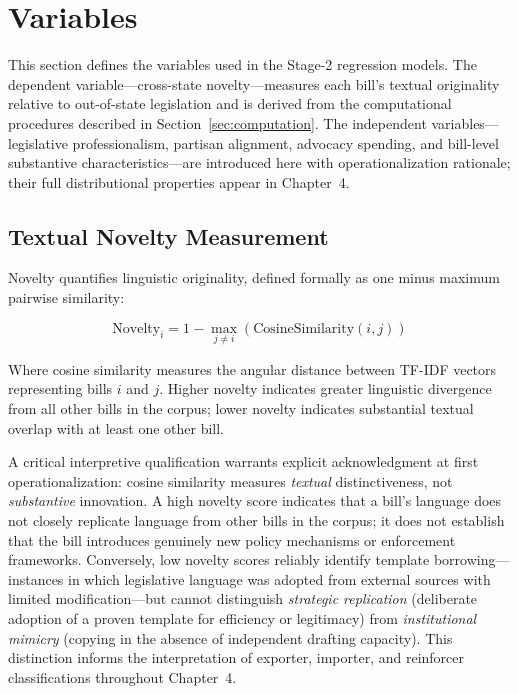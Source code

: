 \section{Variables}
\label{sec:variables}

This section defines the variables used in the Stage-2 regression models. The dependent variable---cross-state novelty---measures each bill's textual originality relative to out-of-state legislation and is derived from the computational procedures described in Section~\ref{sec:computation}. The independent variables---legislative professionalism, partisan alignment, advocacy spending, and bill-level substantive characteristics---are introduced here with operationalization rationale; their full distributional properties appear in Chapter~4.

\subsection{Textual Novelty Measurement}
\label{sec:novelty}
Novelty quantifies linguistic originality, defined formally as one minus maximum pairwise similarity\parencite{wilkersonTracingFlowPolicy2015, linderTextPolicyMeasuring2020}:

\begin{equation}
\text{Novelty}_i = 1 - \max_{j \neq i} \left( \text{CosineSimilarity}(i, j) \right)
\end{equation}

Where cosine similarity measures the angular distance between TF-IDF vectors representing bills $i$ and $j$. Higher novelty indicates greater linguistic divergence from all other bills in the corpus; lower novelty indicates substantial textual overlap with at least one other bill.

A critical interpretive qualification warrants explicit acknowledgment at first operationalization: cosine similarity measures \textit{textual} distinctiveness, not \textit{substantive} innovation. A high novelty score indicates that a bill's language does not closely replicate language from other bills in the corpus; it does not establish that the bill introduces genuinely new policy mechanisms or enforcement frameworks. Conversely, low novelty scores reliably identify template borrowing---instances in which legislative language was adopted from external sources with limited modification---but cannot distinguish \textit{strategic replication} (deliberate adoption of a proven template for efficiency or legitimacy) from \textit{institutional mimicry} (copying in the absence of independent drafting capacity). This distinction informs the interpretation of exporter, importer, and reinforcer classifications throughout Chapter~4.

